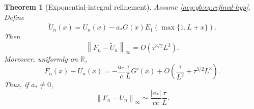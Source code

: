 \documentclass[11pt,letterpaper]{article}
\numberwithin{equation}{section}
\newtheorem{theorem}{Theorem}[section]
\theoremstyle{remark}\newtheorem{remark}[theorem]{Remark}
\theoremstyle{definition}\newtheorem{definition}[theorem]{Definition}\theoremstyle{plain}
\newcommand{\R}{\mathbb R}
\newcommand{\norminf}[1]{\left\lVert #1\right\rVert_\infty}
\begin{document}
\begin{theorem}[Exponential-integral refinement]\label{ncy:gb:thm:e1}
Assume \eqref{ncy:gb:eq:refined-hyp}. Define
\[
 \widetilde U_n(x)
 =U_n(x)-a_*G(x)E_1(\max\{1,L+x\}).
\]
Then
\begin{equation}\label{ncy:gb:eq:e1-error}
 \norminf{F_n-\widetilde U_n}=O(\tau^{3/2}L^3).
\end{equation}
Moreover, uniformly on \(\R\),
\begin{equation}\label{ncy:gb:eq:sharp-component-profile}
 F_n(x)-U_n(x)
 =-\frac{a_*}{c}\frac{\tau}{L}G'(x)
 +O\left(\frac{\tau}{L^2}+\tau^{3/2}L^3\right).
\end{equation}
Thus, if \(a_*\ne0\),
\begin{equation}\label{ncy:gb:eq:sharp-lattice-error}
 \norminf{F_n-U_n}\sim\frac{|a_*|}{ce}\frac{\tau}{L}.
\end{equation}
\end{theorem}
\end{document}

